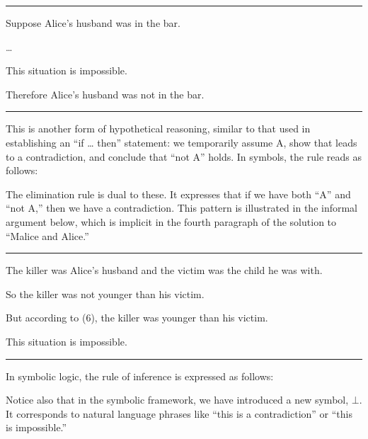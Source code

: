 \documentclass[letterpaper,10pt,english]{sphinxmanual}
\begin{document}
\bigskip\hrule\bigskip


\sphinxAtStartPar
Suppose Alice’s husband was in the bar.

\sphinxAtStartPar
…

\sphinxAtStartPar
This situation is impossible.

\sphinxAtStartPar
Therefore Alice’s husband was not in the bar.


\bigskip\hrule\bigskip


\sphinxAtStartPar
This is another form of hypothetical reasoning, similar to that used in establishing an “if … then” statement: we temporarily assume A, show that leads to a contradiction, and conclude that “not A” holds. In symbols, the rule reads as follows:



\begin{center}
\AXM{}
\noLine
\UIM{\vdots}
\noLine
\UIM{\bot}
\DP
\end{center}

\sphinxAtStartPar
The elimination rule is dual to these. It expresses that if we have both “A” and “not A,” then we have a contradiction. This pattern is illustrated in the informal argument below, which is implicit in the fourth paragraph of the solution to “Malice and Alice.”


\bigskip\hrule\bigskip


\sphinxAtStartPar
The killer was Alice’s husband and the victim was the child he was with.

\sphinxAtStartPar
So the killer was not younger than his victim.

\sphinxAtStartPar
But according to (6), the killer was younger than his victim.

\sphinxAtStartPar
This situation is impossible.


\bigskip\hrule\bigskip


\sphinxAtStartPar
In symbolic logic, the rule of inference is expressed as follows:



\begin{center}
\BIM{\bot}
\DP
\end{center}

\sphinxAtStartPar
Notice also that in the symbolic framework, we have introduced a new symbol, \(\bot\). It corresponds to natural language phrases like “this is a contradiction” or “this is impossible.”
\end{document}
